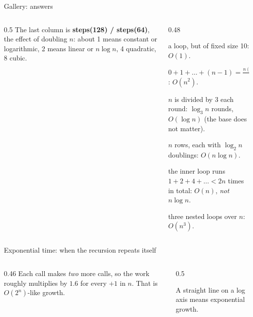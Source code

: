 \documentclass[aspectratio=169,10pt]{beamer}
\newcommand{\pyouts}[2]{}
\begin{document}
\begin{frame}{Gallery: answers}
\begin{columns}[T]
\begin{column}{0.5\textwidth}
\vspace{2mm}
{\small The last column is \textbf{steps(128) / steps(64)}, the effect of doubling $n$: about 1 means constant or logarithmic, 2 means linear or $n\log n$, 4 quadratic, 8 cubic.}
\end{column}
\begin{column}{0.48\textwidth}
{\footnotesize
\begin{description}\setlength\itemsep{2pt}
\item[A] a loop, but of fixed size 10: $O(1)$.
\item[B] $0+1+\dots+(n-1)=\frac{n(n-1)}{2}$: $O(n^2)$.
\item[C] $n$ is divided by 3 each round: $\log_3 n$ rounds, $O(\log n)$ (the base does not matter).
\item[D] $n$ rows, each with $\log_2 n$ doublings: $O(n\log n)$.
\item[E] the inner loop runs $1+2+4+\dots<2n$ times in total: $O(n)$, \emph{not} $n\log n$.
\item[F] three nested loops over $n$: $O(n^3)$.
\end{description}}
\end{column}
\end{columns}
\end{frame}

\begin{frame}{Exponential time: when the recursion repeats itself}
\begin{columns}[T]
\begin{column}{0.46\textwidth}
\vspace{2mm}
\vspace{1mm}
{\small Each call makes \emph{two} more calls, so the work roughly multiplies by $1.6$ for every $+1$ in $n$. That is $O(2^n)$-like growth.}
\end{column}
\begin{column}{0.5\textwidth}
\begin{sfig}[0.45]
\end{sfig}
{\tiny A straight line on a log axis means exponential growth.}
\vspace{2mm}

\pyouts{\fontsize{7.2}{8.6}}{growth}
\end{column}
\end{columns}
\end{frame}
\end{document}
